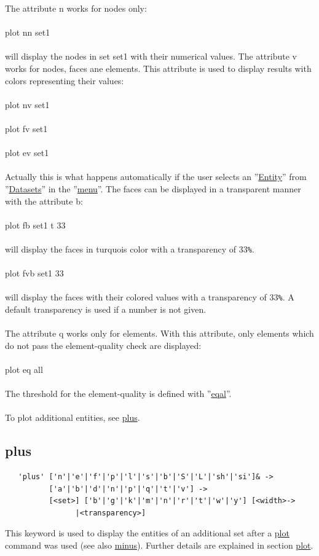 \documentclass{article}
\providecommand{\htmlref}[2]{\hyperref[#2]{#1}}
\begin{document}
The attribute n works for nodes only:\\\\plot nn set1\\\\will display the nodes in set set1 with their numerical values. The attribute v works for nodes, faces ane elements. This attribute is used to display results with colors representing their values:\\\\plot nv set1\\\\plot fv set1\\\\plot ev set1\\\\Actually this is what happens automatically if the user selects an ''\htmlref{Entity}{Entity}'' from ''\htmlref{Datasets}{Datasets}'' in the ''\htmlref{menu}{menu}''. The faces can be displayed in a transparent manner with the attribute b:\\\\plot fb set1 t 33\\\\will display the faces in turquois color with a transparency of 33\verb_%_.\\\\plot fvb set1 33\\\\will display the faces with their colored values with a transparency of 33\verb_%_. A default transparency is used if a number is not given.\\\\
The attribute q works only for elements. With this attribute, only elements which do not pass the element-quality check are displayed:\\\\
plot eq all\\\\ The threshold for the element-quality is defined with ''\htmlref{eqal}{eqal}''.\\\\
To plot additional entities, see \htmlref{plus}{plus}.

\subsection{\label{plus}plus}
\begin{verbatim}
   'plus' ['n'|'e'|'f'|'p'|'l'|'s'|'b'|'S'|'L'|'sh'|'si']& ->
          ['a'|'b'|'d'|'n'|'p'|'q'|'t'|'v'] ->
          [<set>] ['b'|'g'|'k'|'m'|'n'|'r'|'t'|'w'|'y'] [<width>->
                |<transparency>] 
\end{verbatim}
This keyword is used to display the entities of an additional set after a \htmlref{plot}{plot} command was used (see also \htmlref{minus}{minus}). Further details are explained in section \htmlref{plot}{plot}.
\end{document}
